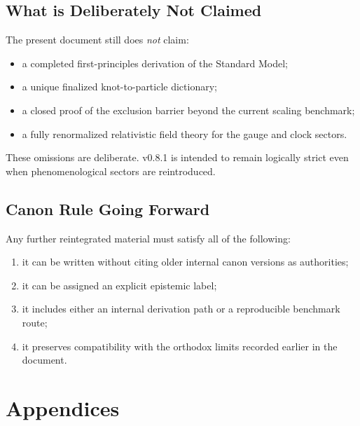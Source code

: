 \documentclass[11pt]{article}
\theoremstyle{definition}
\theoremstyle{plain}
\theoremstyle{remark}
\begin{document}
    \subsection{What is Deliberately Not Claimed}

        The present document still does \emph{not} claim:
        \begin{itemize}
            \item a completed first-principles derivation of the Standard Model;
            \item a unique finalized knot-to-particle dictionary;
            \item a closed proof of the exclusion barrier beyond the current scaling benchmark;
            \item a fully renormalized relativistic field theory for the gauge and clock sectors.
        \end{itemize}

        These omissions are deliberate. v0.8.1 is intended to remain logically strict even when phenomenological
        sectors are reintroduced.

    \subsection{Canon Rule Going Forward}

        Any further reintegrated material must satisfy all of the following:
        \begin{enumerate}
            \item it can be written without citing older internal canon versions as authorities;
            \item it can be assigned an explicit epistemic label;
            \item it includes either an internal derivation path or a reproducible benchmark route;
            \item it preserves compatibility with the orthodox limits recorded earlier in the document.
        \end{enumerate}

\newpage
\section*{Appendices}
    \setcounter{tocdepth}{1}
    \appendix
\end{document}
